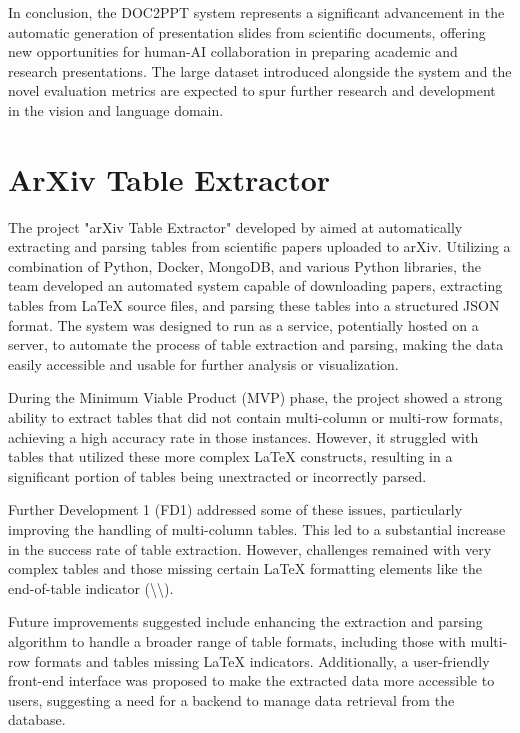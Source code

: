 In conclusion, the DOC2PPT system represents a significant advancement in the automatic generation of presentation slides from scientific documents, offering new opportunities for human-AI collaboration in preparing academic and research presentations. The large dataset introduced alongside the system and the novel evaluation metrics are expected to spur further research and development in the vision and language domain.

\section{ArXiv Table Extractor}

The project "arXiv Table Extractor" developed by \citet{Ramsay:2021:BachelorThesis} aimed at automatically extracting and parsing tables from scientific papers uploaded to arXiv. Utilizing a combination of Python, Docker, MongoDB, and various Python libraries, the team developed an automated system capable of downloading papers, extracting tables from \LaTeX{} source files, and parsing these tables into a structured JSON format. The system was designed to run as a service, potentially hosted on a server, to automate the process of table extraction and parsing, making the data easily accessible and usable for further analysis or visualization.

During the Minimum Viable Product (MVP) phase, the project showed a strong ability to extract tables that did not contain multi-column or multi-row formats, achieving a high accuracy rate in those instances. However, it struggled with tables that utilized these more complex \LaTeX{} constructs, resulting in a significant portion of tables being unextracted or incorrectly parsed.

Further Development 1 (FD1) addressed some of these issues, particularly improving the handling of multi-column tables. This led to a substantial increase in the success rate of table extraction. However, challenges remained with very complex tables and those missing certain \LaTeX{} formatting elements like the end-of-table indicator (\textbackslash\textbackslash).

Future improvements suggested include enhancing the extraction and parsing algorithm to handle a broader range of table formats, including those with multi-row formats and tables missing \LaTeX{} indicators. Additionally, a user-friendly front-end interface was proposed to make the extracted data more accessible to users, suggesting a need for a backend to manage data retrieval from the database.

